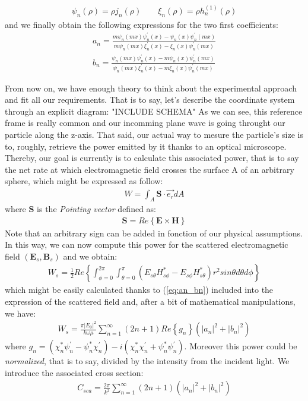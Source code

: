 \documentclass{article}
\begin{document}
\begin{align}
\psi_{n}(\rho)=\rho j_{n}(\rho) \qquad \xi_{n}(\rho)=\rho h^{(1)}_{n}(\rho)
\end{align}
and we finally obtain the following expressions for the two first coefficients:
\begin{equation}\label{eq:an_bn}
\begin{aligned}
a_{n} = \frac{m\psi_{n}(mx)\psi^{'}_{n}(x)-\psi_{n}(x)\psi^{'}_{n}(mx)}{m\psi_{n}(mx)\xi^{'}_{n}(x)-\xi_{n}(x)\psi^{'}_{n}(mx)}\\
b_{n} = \frac{\psi_{n}(mx)\psi^{'}_{n}(x)-m\psi_{n}(x)\psi^{'}_{n}(mx)}{\psi_{n}(mx)\xi^{'}_{n}(x)-m\xi_{n}(x)\psi^{'}_{n}(mx)}
\end{aligned}
\end{equation}

From now on, we have enough theory to think about the experimental approach and fit all our requirements. That is to say, let's describe the coordinate system through an explicit diagram:
"INCLUDE SCHEMA"
As we can see, this reference frame is really common and our incomming plane wave is going throught our particle along the z-axis. That said, our actual way to mesure the particle's size is to, roughly, retrieve the power emitted by it thanks to an optical microscope. Thereby, our goal is currently is to calculate this associated power, that is to say the net rate at which electromagnetic field crosses the surface A of an arbitrary sphere, which might be expressed as follow:
\begin{align}
W=\int_{A}^{}\textbf{S}\cdot \overrightarrow{e_{r}}dA
\end{align}
where $\textbf{S}$ is the \textit{Pointing vector} defined as:
\begin{align}
\textbf{S} = Re\left\{\textbf{E} \times \textbf{H}\right\}
\end{align}
Note that an arbitrary sign can be added in fonction of our physical assumptions. In this way, we can now compute this power for the scattered electromagnetic field $(\textbf{E}_{s}, \textbf{B}_{s})$ and we obtain:
\begin{align}
W_{s}=\frac{1}{2}Re\left\{ \int_{\phi=0}^{2\pi}\int_{\theta=0}^{\pi} (E_{s\theta}H^{*}_{s\phi}- E_{s\phi}H^{*}_{s\theta})r^{2}sin\theta d\theta d\phi\right\}
\end{align}
which might be easily calculated thanks to (\ref{eq:an_bn}) included into the expression of the scattered field and, after a bit of mathematical manipulations, we have:
\begin{align}
W_{s}=\frac{\pi\left| E_{0} \right|^{2}}{k\omega\mu}\sum_{n=1}^{\infty }(2n+1)Re\left\{ g_{n} \right\}(\left| a_{n} \right|^{2}+\left| b_{n} \right|^{2})
\end{align}
where $g_{n}=(\chi^{*}_{n}\psi^{'}_{n}-\psi^{*}_{n}\chi^{'}_{n})-i(\chi^{*}_{n}\chi^{'}_{n}+\psi^{*}_{n}\psi^{'}_{n})$. Moreover this power could be \textit{normalized}, that is to say, divided by the intensity from the incident light. We introduce the associated cross section:
\begin{align}
C_{sca}=\frac{2\pi}{k^{2}}\sum_{n=1}^{\infty }(2n+1)(\left| a_{n} \right|^{2}+\left| b_{n} \right|^{2})
\end{align}
\end{document}
